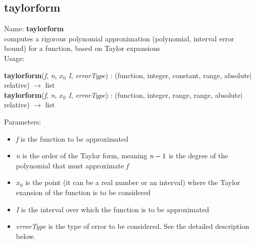 \subsection{taylorform}
\label{labtaylorform}
\noindent Name: \textbf{taylorform}\\
computes a rigorous polynomial approximation (polynomial, interval error bound) for a function, based on Taylor expansions\\
\noindent Usage: 
\begin{center}
\textbf{taylorform}(\emph{f}, \emph{n}, \emph{$x_0$} \emph{I}, \emph{errorType}) : (\textsf{function}, \textsf{integer}, \textsf{constant}, \textsf{range}, \textsf{absolute$|$relative}) $\rightarrow$ \textsf{list}\\
\textbf{taylorform}(\emph{f}, \emph{n}, \emph{$x_0$} \emph{I}, \emph{errorType}) : (\textsf{function}, \textsf{integer}, \textsf{range}, \textsf{range}, \textsf{absolute$|$relative}) $\rightarrow$ \textsf{list}\\
\end{center}
Parameters: 
\begin{itemize}
\item \emph{f} is the function to be approximated
\item \emph{n} is the order of the Taylor form, meaning $\emph{n}-1$ is the degree of the polynomial that must approximate \emph{f}
\item \emph{$x_0$} is the point (it can be a real number or an interval) where the Taylor exansion of the function is to be considered
\item \emph{I} is the interval over which the function is to be approximated
\item \emph{errorType} is the type of error to be considered. See the detailed description below.
\end{itemize}
